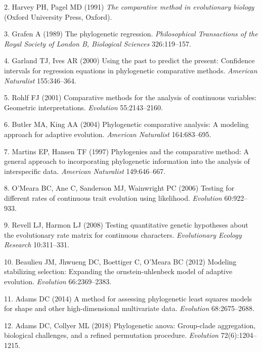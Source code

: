 \documentclass[9pt,twocolumn,twoside,lineno]{pnas-new}
\begin{document}
\leavevmode\hypertarget{ref-HarveyPagel1991}{}%
2. Harvey PH, Pagel MD (1991) \emph{The comparative method in
evolutionary biology} (Oxford University Press, Oxford).

\leavevmode\hypertarget{ref-Grafen1989}{}%
3. Grafen A (1989) The phylogenetic regression. \emph{Philosophical
Transactions of the Royal Society of London B, Biological Sciences}
326:119--157.

\leavevmode\hypertarget{ref-GarlandIves2000}{}%
4. Garland TJ, Ives AR (2000) Using the past to predict the present:
Confidence intervals for regression equations in phylogenetic
comparative methods. \emph{American Naturalist} 155:346--364.

\leavevmode\hypertarget{ref-Rohlf2001}{}%
5. Rohlf FJ (2001) Comparative methods for the analysis of continuous
variables: Geometric interpretations. \emph{Evolution} 55:2143--2160.

\leavevmode\hypertarget{ref-ButlerKing2004}{}%
6. Butler MA, King AA (2004) Phylogenetic comparative analysis: A
modeling approach for adaptive evolution. \emph{American Naturalist}
164:683--695.

\leavevmode\hypertarget{ref-MartinsHansen1997}{}%
7. Martins EP, Hansen TF (1997) Phylogenies and the comparative method:
A general approach to incorporating phylogenetic information into the
analysis of interspecific data. \emph{American Naturalist} 149:646--667.

\leavevmode\hypertarget{ref-OMeara_et_al2006}{}%
8. O'Meara BC, Ane C, Sanderson MJ, Wainwright PC (2006) Testing for
different rates of continuous trait evolution using likelihood.
\emph{Evolution} 60:922--933.

\leavevmode\hypertarget{ref-RevellHarmon2008}{}%
9. Revell LJ, Harmon LJ (2008) Testing quantitative genetic hypotheses
about the evolutionary rate matrix for continuous characters.
\emph{Evolutionary Ecology Research} 10:311--331.

\leavevmode\hypertarget{ref-Beaulieu_et_al2012}{}%
10. Beaulieu JM, Jhwueng DC, Boettiger C, O'Meara BC (2012) Modeling
stabilizing selection: Expanding the ornstein-uhlenbeck model of
adaptive evolution. \emph{Evolution} 66:2369--2383.

\leavevmode\hypertarget{ref-Adams2014b}{}%
11. Adams DC (2014) A method for assessing phylogenetic least squares
models for shape and other high-dimensional multivariate data.
\emph{Evolution} 68:2675--2688.

\leavevmode\hypertarget{ref-AdamsCollyer2018b}{}%
12. Adams DC, Collyer ML (2018) Phylogenetic anova: Group-clade
aggregation, biological challenges, and a refined permutation procedure.
\emph{Evolution} 72(6):1204--1215.
\end{document}
